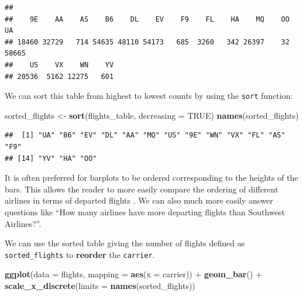 \documentclass[]{tufte-book}
\newenvironment{Shaded}{\begin{snugshade}}{\end{snugshade}}
\newcommand{\KeywordTok}[1]{\textcolor[rgb]{0.13,0.29,0.53}{\textbf{{#1}}}}
\newcommand{\DataTypeTok}[1]{\textcolor[rgb]{0.13,0.29,0.53}{{#1}}}
\newcommand{\StringTok}[1]{\textcolor[rgb]{0.31,0.60,0.02}{{#1}}}
\newcommand{\CommentTok}[1]{\textcolor[rgb]{0.56,0.35,0.01}{\textit{{#1}}}}
\newcommand{\OtherTok}[1]{\textcolor[rgb]{0.56,0.35,0.01}{{#1}}}
\newcommand{\NormalTok}[1]{{#1}}
\begin{document}
\begin{verbatim}
## 
##    9E    AA    AS    B6    DL    EV    F9    FL    HA    MQ    OO    UA 
## 18460 32729   714 54635 48110 54173   685  3260   342 26397    32 58665 
##    US    VX    WN    YV 
## 20536  5162 12275   601
\end{verbatim}

\begin{Shaded}
\end{Shaded}

We can sort this table from highest to lowest counts by using the
\texttt{sort} function:

\begin{Shaded}
\begin{Highlighting}[]
\NormalTok{sorted_flights <-}\StringTok{ }\KeywordTok{sort}\NormalTok{(flights_table, }\DataTypeTok{decreasing =} \OtherTok{TRUE}\NormalTok{)}
\KeywordTok{names}\NormalTok{(sorted_flights)}
\end{Highlighting}
\end{Shaded}

\begin{verbatim}
##  [1] "UA" "B6" "EV" "DL" "AA" "MQ" "US" "9E" "WN" "VX" "FL" "AS" "F9"
## [14] "YV" "HA" "OO"
\end{verbatim}

\begin{Shaded}
\end{Shaded}

It is often preferred for barplots to be ordered corresponding to the
heights of the bars. This allows the reader to more easily compare the
ordering of different airlines in terms of departed flights
\citep{robbins2013}. We can also much more easily answer questions like
``How many airlines have more departing flights than Southwest
Airlines?''.

We can use the sorted table giving the number of flights defined as
\texttt{sorted\_flights} to \textbf{reorder} the \texttt{carrier}.

\begin{Shaded}
\begin{Highlighting}[]
\KeywordTok{ggplot}\NormalTok{(}\DataTypeTok{data =} \NormalTok{flights, }\DataTypeTok{mapping =} \KeywordTok{aes}\NormalTok{(}\DataTypeTok{x =} \NormalTok{carrier)) +}
\StringTok{  }\KeywordTok{geom_bar}\NormalTok{() +}
\StringTok{  }\KeywordTok{scale_x_discrete}\NormalTok{(}\DataTypeTok{limits =} \KeywordTok{names}\NormalTok{(sorted_flights))}
\end{Highlighting}
\end{Shaded}
\end{document}
